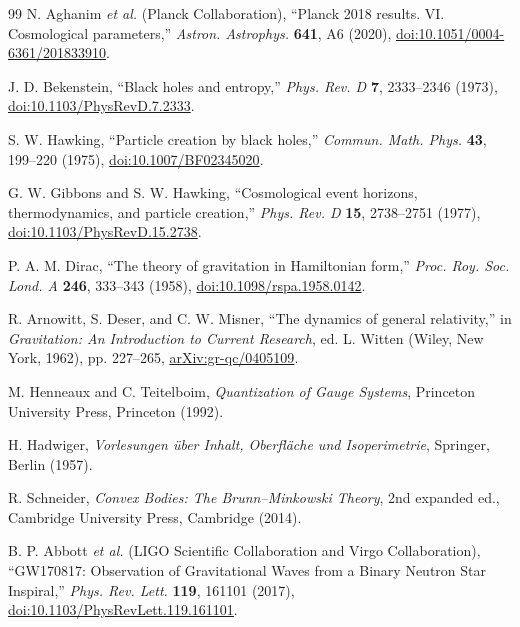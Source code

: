 \documentclass[aps,prd,reprint,nofootinbib,superscriptaddress]{revtex4-2}
\numberwithin{equation}{section}
\theoremstyle{definition}
\theoremstyle{plain}
\begin{document}
\begin{thebibliography}{99}
N. Aghanim \emph{et al.} (Planck Collaboration),
``Planck 2018 results. VI. Cosmological parameters,''
\emph{Astron. Astrophys.} \textbf{641}, A6 (2020),
\href{https://doi.org/10.1051/0004-6361/201833910}{doi:10.1051/0004-6361/201833910}.

J. D. Bekenstein,
``Black holes and entropy,''
\emph{Phys. Rev. D} \textbf{7}, 2333--2346 (1973),
\href{https://doi.org/10.1103/PhysRevD.7.2333}{doi:10.1103/PhysRevD.7.2333}.

S. W. Hawking,
``Particle creation by black holes,''
\emph{Commun. Math. Phys.} \textbf{43}, 199--220 (1975),
\href{https://doi.org/10.1007/BF02345020}{doi:10.1007/BF02345020}.

G. W. Gibbons and S. W. Hawking,
``Cosmological event horizons, thermodynamics, and particle creation,''
\emph{Phys. Rev. D} \textbf{15}, 2738--2751 (1977),
\href{https://doi.org/10.1103/PhysRevD.15.2738}{doi:10.1103/PhysRevD.15.2738}.

P. A. M. Dirac,
``The theory of gravitation in Hamiltonian form,''
\emph{Proc. Roy. Soc. Lond. A} \textbf{246}, 333--343 (1958),
\href{https://doi.org/10.1098/rspa.1958.0142}{doi:10.1098/rspa.1958.0142}.

R. Arnowitt, S. Deser, and C. W. Misner,
``The dynamics of general relativity,''
in \emph{Gravitation: An Introduction to Current Research},
ed. L. Witten (Wiley, New York, 1962), pp. 227--265,
\href{https://arxiv.org/abs/gr-qc/0405109}{arXiv:gr-qc/0405109}.

M. Henneaux and C. Teitelboim,
\emph{Quantization of Gauge Systems},
Princeton University Press, Princeton (1992).

H. Hadwiger,
\emph{Vorlesungen \"uber Inhalt, Oberfl\"ache und Isoperimetrie},
Springer, Berlin (1957).

R. Schneider,
\emph{Convex Bodies: The Brunn--Minkowski Theory},
2nd expanded ed., Cambridge University Press, Cambridge (2014).

B. P. Abbott \emph{et al.} (LIGO Scientific Collaboration and Virgo Collaboration),
``GW170817: Observation of Gravitational Waves from a Binary Neutron Star Inspiral,''
\emph{Phys. Rev. Lett.} \textbf{119}, 161101 (2017),
\href{https://doi.org/10.1103/PhysRevLett.119.161101}{doi:10.1103/PhysRevLett.119.161101}.


\end{thebibliography}
\end{document}
